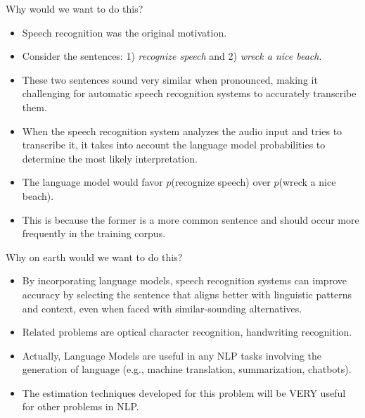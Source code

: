 \documentclass[10pt]{beamer}
\begin{document}
\begin{frame}{Why would we want to do this?}

\begin{scriptsize}
\begin{itemize}
\item Speech recognition was the original motivation.

\item Consider the sentences: 1) \textit{recognize speech} and 2) \textit{wreck a nice beach}.

\item   These two sentences sound very similar when pronounced, making it challenging for automatic speech recognition systems to accurately transcribe them.
    
    
\item When the speech recognition system analyzes the audio input and tries to transcribe it, it takes into account the language model probabilities to determine the most likely interpretation.
    
\item The language model would favor $p$(recognize speech) over $p$(wreck a nice beach).

\item This is because the former is a more common sentence and should occur more frequently in the training corpus.
    

\end{itemize}
\end{scriptsize}

\end{frame}

\begin{frame}{Why on earth would we want to do this?}

\begin{scriptsize}
\begin{itemize}

\item By incorporating language models, speech recognition systems can improve accuracy by selecting the sentence that aligns better with linguistic patterns and context, even when faced with similar-sounding alternatives.



\item Related problems are optical character recognition, handwriting recognition.

\item Actually, Language Models are useful in any NLP tasks involving the generation of language (e.g., machine translation, summarization, chatbots).

\item The estimation techniques developed for this problem will be VERY useful for other problems in NLP.


\end{itemize}
\end{scriptsize}

\end{frame}
\end{document}
